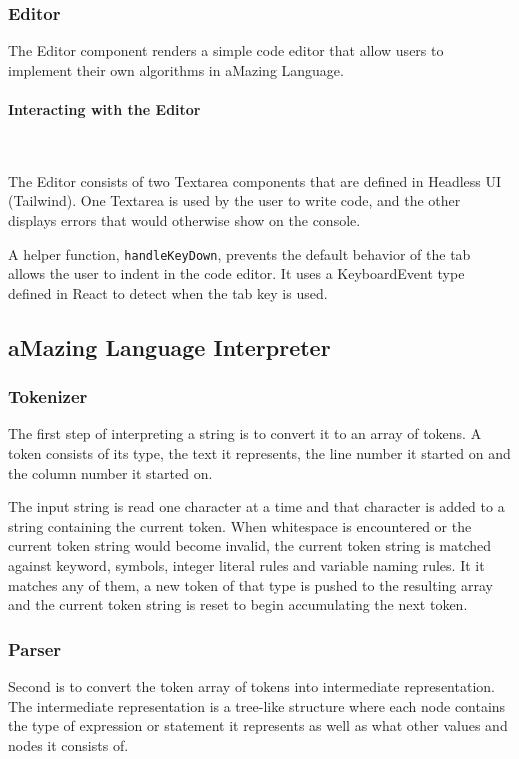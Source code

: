 \subsubsection{Editor}

The Editor component renders a simple code editor that allow users to implement their own algorithms in aMazing Language.

\paragraph{Interacting with the Editor} \

The Editor consists of two Textarea components that are defined in Headless UI (Tailwind). One Textarea is used by the user to write code, and the other displays errors that would otherwise show on the console.

A helper function, \texttt{handleKeyDown}, prevents the default behavior of the tab allows the user to indent in the code editor. It uses a KeyboardEvent type defined in React to detect when the tab key is used.

\subsection{aMazing Language Interpreter}

\subsubsection{Tokenizer}

The first step of interpreting a string is to convert it to an array of tokens. A token consists of its type, the text it represents, the line number it started on and the column number it started on.

The input string is read one character at a time and that character is added to a string containing the current token. When whitespace is encountered or the current token string would become invalid, the current token string is matched against keyword, symbols, integer literal rules and variable naming rules. It it matches any of them, a new token of that type is pushed to the resulting array and the current token string is reset to begin accumulating the next token.

\subsubsection{Parser}

Second is to convert the token array of tokens into intermediate representation. The intermediate representation is a tree-like structure where each node contains the type of expression or statement it represents as well as what other values and nodes it consists of.

